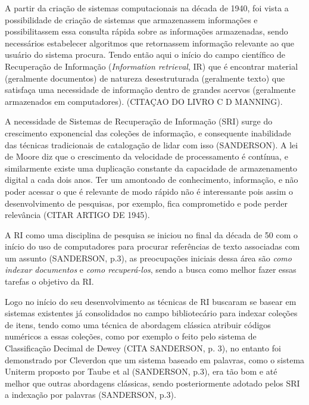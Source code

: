 
A partir da criação de sistemas computacionais na década de 1940, foi vista a possibilidade de criação de sistemas que armazenassem informações e possibilitassem essa consulta rápida sobre as informações armazenadas, sendo necessários estabelecer algoritmos que retornassem informação relevante ao que usuário do sistema procura. 
Tendo então aqui o início do campo científico de Recuperação de Informação (\textit{Information retrieval}, IR) que é encontrar material (geralmente documentos) de natureza desestruturada (geralmente texto) que satisfaça uma necessidade de informação dentro de grandes acervos (geralmente armazenados em computadores). (CITAÇAO DO LIVRO C D MANNING).

A necessidade de Sistemas de Recuperação de Informação (SRI) surge do crescimento exponencial das coleções de informação, e consequente inabilidade das técnicas tradicionais de catalogação de lidar com isso (SANDERSON). 
A lei de Moore diz que o crescimento da velocidade de processamento é contínua, e similarmente existe uma duplicação constante da capacidade de armazenamento digital a cada dois anos. 
Ter um amontoado de conhecimento, informação, e não poder acessar o que é relevante de modo rápido não é interessante pois assim o desenvolvimento de pesquisas, por exemplo, fica comprometido e pode perder relevância (CITAR ARTIGO DE 1945).

A RI como uma disciplina de pesquisa se iniciou no final da década de 50 com o início do uso de computadores para procurar referências de texto associadas com um assunto (SANDERSON, p.3), as preocupações iniciais dessa área são \textit{como indexar documentos} e \textit{como recuperá-los}, sendo a busca como melhor fazer essas tarefas o objetivo da RI.

Logo no início do seu desenvolvimento as técnicas de RI buscaram se basear em sistemas existentes já consolidados no campo bibliotecário para indexar coleções de itens, tendo como uma técnica de abordagem clássica atribuir códigos numéricos a essas coleções, como por exemplo o feito pelo sistema de Classificação Decimal de Dewey (CITA SANDERSON, p. 3), no entanto foi demonstrado por Cleverdon que um sistema baseado em palavras, como o sistema Uniterm proposto por Taube et al (SANDERSON, p.3), era tão bom e até melhor que outras abordagens clássicas, sendo posteriormente adotado pelos SRI a indexação por palavras (SANDERSON, p.3).

